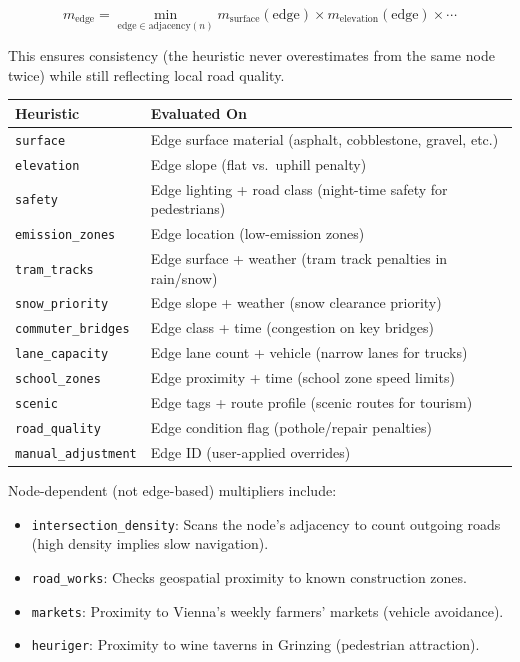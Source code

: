 \documentclass[12pt,a4paper]{article}
\begin{document}
\[
m_{\text{edge}} = \min_{\text{edge} \in \text{adjacency}(n)} m_{\text{surface}}(\text{edge}) \times m_{\text{elevation}}(\text{edge}) \times \cdots
\]

This ensures consistency (the heuristic never overestimates from the same node twice) while still reflecting local road quality.

\begin{table}[H]
\centering
\begin{tabular}{ll}
\toprule
\textbf{Heuristic} & \textbf{Evaluated On} \\
\midrule
\texttt{surface} & Edge surface material (asphalt, cobblestone, gravel, etc.) \\
\texttt{elevation} & Edge slope (flat vs.\ uphill penalty) \\
\texttt{safety} & Edge lighting + road class (night-time safety for pedestrians) \\
\texttt{emission\_zones} & Edge location (low-emission zones) \\
\texttt{tram\_tracks} & Edge surface + weather (tram track penalties in rain/snow) \\
\texttt{snow\_priority} & Edge slope + weather (snow clearance priority) \\
\texttt{commuter\_bridges} & Edge class + time (congestion on key bridges) \\
\texttt{lane\_capacity} & Edge lane count + vehicle (narrow lanes for trucks) \\
\texttt{school\_zones} & Edge proximity + time (school zone speed limits) \\
\texttt{scenic} & Edge tags + route profile (scenic routes for tourism) \\
\texttt{road\_quality} & Edge condition flag (pothole/repair penalties) \\
\texttt{manual\_adjustment} & Edge ID (user-applied overrides) \\
\bottomrule
\end{tabular}
\end{table}

Node-dependent (not edge-based) multipliers include:
\begin{itemize}
  \item \texttt{intersection\_density}: Scans the node's adjacency to count outgoing roads (high density implies slow navigation).
  \item \texttt{road\_works}: Checks geospatial proximity to known construction zones.
  \item \texttt{markets}: Proximity to Vienna's weekly farmers' markets (vehicle avoidance).
  \item \texttt{heuriger}: Proximity to wine taverns in Grinzing (pedestrian attraction).
\end{itemize}
\end{document}
